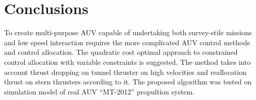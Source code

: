 \documentclass[a0,portrait]{a0poster}
\begin{document}
\vspace{-2.0cm}
\hspace{37.85cm}
\begin{minipage}[t]{0.48\linewidth}
\color{SaddleBrown}
\end{minipage}

\vspace{-14cm}
\color{DarkSlateGray}
\begin{minipage}[t]{0.48\linewidth}
\section*{Conclusions}
To create multi-purpose AUV capable of undertaking both survey-stile missions and low speed interaction requires the more complicated AUV control methods and control allocation.
The quadratic cost optimal approach to constrained control allocation with variable constraints is suggested.
The method takes into account thrust dropping on tunnel thruster on high velocities and reallocation thrust on stern thrusters according to it.
The proposed algorithm was tested on simulation model of real AUV ``MT-2012'' propultion system.
\end{minipage}
\end{document}
